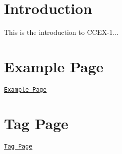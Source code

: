 \hypertarget{index_intro}{}\section{Introduction}\label{index_intro}
This is the introduction to C\-C\-E\-X-\/1...\hypertarget{index_example}{}\section{Example Page}\label{index_example}
\href{example_page.html}{\tt Example Page}\hypertarget{index_tag}{}\section{Tag Page}\label{index_tag}
\href{tag_page.html}{\tt Tag Page} 